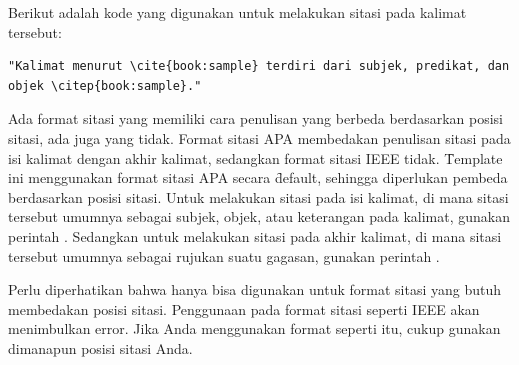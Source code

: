 Berikut adalah kode yang digunakan untuk melakukan sitasi pada kalimat tersebut:
\begin{lstlisting}[language={[latex]tex}]
	"Kalimat menurut \cite{book:sample} terdiri dari subjek, predikat, dan objek \citep{book:sample}."
\end{lstlisting}

Ada format sitasi yang memiliki cara penulisan yang berbeda berdasarkan posisi sitasi, ada juga yang tidak.
Format sitasi APA membedakan penulisan sitasi pada isi kalimat dengan akhir kalimat, sedangkan format sitasi IEEE tidak.
\f{Template} ini menggunakan format sitasi APA secara \f{default}, sehingga diperlukan pembeda berdasarkan posisi sitasi.
Untuk melakukan sitasi pada isi kalimat, di mana sitasi tersebut umumnya sebagai subjek, objek, atau keterangan pada kalimat, gunakan perintah .
Sedangkan untuk melakukan sitasi pada akhir kalimat, di mana sitasi tersebut umumnya sebagai rujukan suatu gagasan, gunakan perintah .

Perlu diperhatikan bahwa  hanya bisa digunakan untuk format sitasi yang butuh membedakan posisi sitasi.
Penggunaan  pada format sitasi seperti IEEE akan menimbulkan error.
Jika Anda menggunakan format seperti itu, cukup gunakan  dimanapun posisi sitasi Anda.

